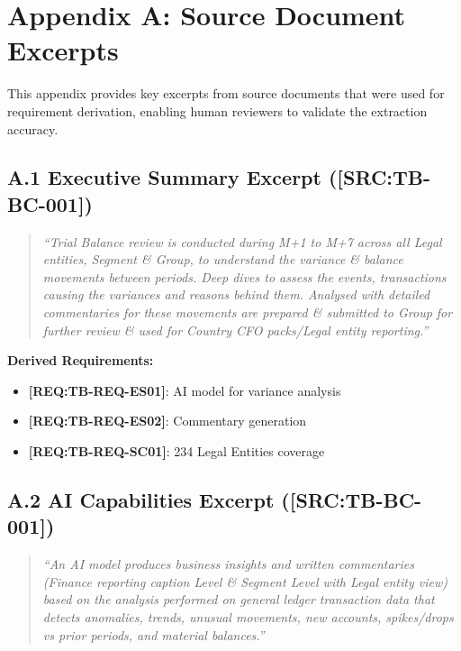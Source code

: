 \documentclass[11pt,a4paper]{article}
\newcommand{\srcref}[1]{\textcolor{sourcegreen}{\textbf{[SRC:#1]}}}
\newcommand{\reqref}[1]{\textcolor{reqpurple}{\textbf{[REQ:#1]}}}
\begin{document}

\newpage
\section*{Appendix A: Source Document Excerpts}

This appendix provides key excerpts from source documents that were used for 
requirement derivation, enabling human reviewers to validate the extraction accuracy.

\subsection*{A.1 Executive Summary Excerpt (\srcref{TB-BC-001})}

\begin{quote}
\textit{``Trial Balance review is conducted during M+1 to M+7 across all Legal entities, 
Segment \& Group, to understand the variance \& balance movements between periods. 
Deep dives to assess the events, transactions causing the variances and reasons 
behind them. Analysed with detailed commentaries for these movements are prepared \& 
submitted to Group for further review \& used for Country CFO packs/Legal entity reporting.''}
\end{quote}

\textbf{Derived Requirements:}
\begin{itemize}[noitemsep]
    \item \reqref{TB-REQ-ES01}: AI model for variance analysis
    \item \reqref{TB-REQ-ES02}: Commentary generation
    \item \reqref{TB-REQ-SC01}: 234 Legal Entities coverage
\end{itemize}

\subsection*{A.2 AI Capabilities Excerpt (\srcref{TB-BC-001})}

\begin{quote}
\textit{``An AI model produces business insights and written commentaries (Finance reporting 
caption Level \& Segment Level with Legal entity view) based on the analysis performed 
on general ledger transaction data that detects anomalies, trends, unusual movements, 
new accounts, spikes/drops vs prior periods, and material balances.''}
\end{quote}
\end{document}
